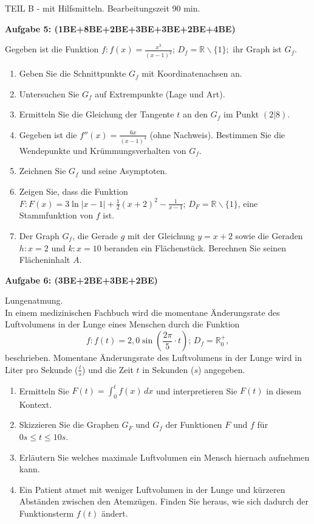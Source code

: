 \documentclass[a4paper,12pt]{article}
\newcommand{\Aufgabe}[1]{
  {
  \vspace*{0.5cm}
  \textsf{\textbf{Aufgabe #1}}
  \vspace*{0.2cm}
  
  }
}
\begin{document}
\newpage
\vspace{1,5cm} {TEIL B} - mit Hilfsmitteln. Bearbeitungszeit 90 min.
\vspace {0,2cm}

\Aufgabe{5: (1BE+8BE+2BE+3BE+3BE+2BE+4BE)} %
Gegeben ist die Funktion $f: f(x) = \frac{x^3}{(x-1)^2};\, D_f=\mathbb{R}\backslash\{1\};$ ihr Graph ist $G_f$.
\begin{enumerate}[label={\alph*)}]
  \item Geben Sie die Schnittpunkte $G_f$ mit Koordinatenachsen an.
  \item Untersuchen Sie $G_f$ auf Extrempunkte (Lage und Art).
  \item Ermitteln Sie die Gleichung der Tangente $t$ an den $G_f$ im Punkt $(2|8)$.
  \item Gegeben ist die $f''(x)=\frac{6x}{(x-1)^4}$ (ohne Nachweis). Bestimmen Sie die Wendepunkte und Krümmungsverhalten von $G_f$.
  \item Zeichnen Sie $G_f$ und seine Asymptoten.
  \item Zeigen Sie, dass die Funktion $F: F(x) = 3 \ln |x-1| + \frac{1}{2}(x+2)^2 - \frac{1}{x-1};\, D_F=\mathbb{R}\backslash\{1\}$, eine Stammfunktion von $f$ ist.
  \item Der Graph $G_f$, die Gerade $g$ mit der Gleichung $y=x+2$ sowie die Geraden $h: x=2$ und $k: x=10$ beranden ein Flächenstück. Berechnen Sie seinen Flächeninhalt $A$.
\end{enumerate}

\Aufgabe{6: (3BE+2BE+3BE+2BE)}
Lungenatmung.\\
In einem medizinischen Fachbuch wird die momentane Änderungsrate des Luftvolumens in der Lunge eines Menschen durch die Funktion
\[f:f(t) = 2,0 \sin (\frac{2\pi}{5}\cdot t);\, D_f=\mathbb{R}_0^+,\] beschrieben.
Momentane Änderungsrate des Luftvolumens in der Lunge wird in Liter pro Sekunde ($\frac{l}{s}$) und die Zeit $t$ in Sekunden ($s$) angegeben.
\begin{enumerate}[label={\alph*)}]
  \item Ermitteln Sie $F(t)=\int_0^t f(x)\, dx$ und interpretieren Sie $F(t)$ in diesem Kontext.
  \item Skizzieren Sie die Graphen $G_F$ und $G_f$ der Funktionen $F$ und $f$ für $0 s \le t \le 10 s$.
  \item Erläutern Sie welches maximale Luftvolumen ein Mensch hiernach aufnehmen kann.
  \item Ein Patient atmet mit weniger Luftvolumen in der Lunge und kürzeren Abständen zwischen den Atemzügen. Finden Sie heraus, wie sich dadurch der Funktionsterm $f(t)$ ändert.
\end{enumerate}
\end{document}
